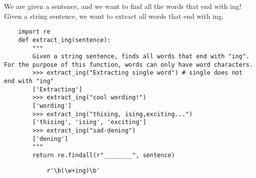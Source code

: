 \begin{blocksection}
    \question We are given a sentence, and we want to find all the words that end with ing! Given a string sentence, we want to extract all words that end with ing.
    
    \begin{lstlisting}
    import re
    def extract_ing(sentence):
        """
        Given a string sentence, finds all words that end with "ing". For the purpose of this function, words can only have word characters.
        >>> extract_ing("Extracting single word") # single does not end with "ing"
        ['Extracting']
        >>> extract_ing("cool wording!")
        ['wording']
        >>> extract_ing("thising, ising,exciting...")
        ['thising', 'ising', 'exciting']
        >>> extract_ing("sad-dening")
        ['dening']
        """
        return re.findall(r"________", sentence)
    \end{lstlisting}
    
    \begin{solution}[2in]
        \begin{lstlisting}
            r'\b(\w+ing)\b'
        \end{lstlisting}
    \end{solution}
    \end{blocksection}
    